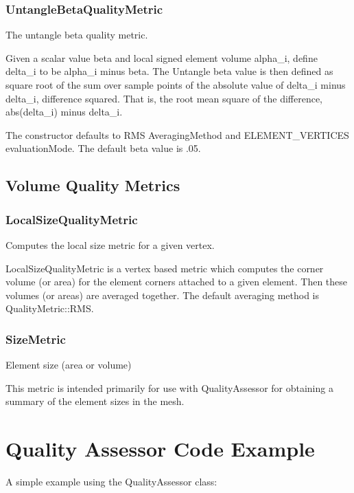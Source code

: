 \subsubsection{UntangleBetaQualityMetric}

  The untangle beta quality metric.

  Given a scalar value beta and local signed element volume alpha\_i, define delta\_i to be alpha\_i minus beta.  The Untangle beta value is then defined as square root of the sum over sample points of the absolute value of delta\_i minus delta\_i, difference squared. That is, the root mean square of the difference, abs(delta\_i) minus delta\_i.

The constructor defaults to RMS AveragingMethod and ELEMENT\_VERTICES evaluationMode.  The default beta value is .05.

\subsection{Volume Quality Metrics}

\subsubsection{LocalSizeQualityMetric}

  Computes the local size metric for a given vertex.

  LocalSizeQualityMetric is a vertex based metric which computes the corner volume (or area) for the element corners attached to a given element.  Then these volumes (or areas) are averaged together.  The default averaging method is QualityMetric::RMS.

\subsubsection{SizeMetric}

Element size (area or volume)

This metric is intended primarily for use with QualityAssessor for obtaining a summary of the element sizes in the mesh.



\clearpage
\section{Quality Assessor Code Example}

A simple example using the QualityAssessor class:

